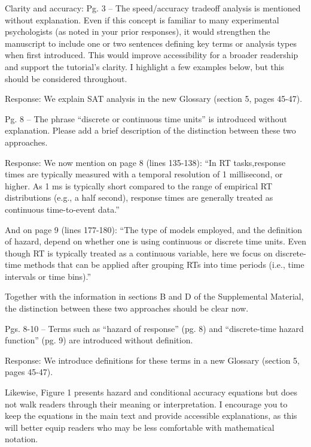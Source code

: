 \documentclass[
]{article}
\renewenvironment{quote}{\begin{leftbar}}{\end{leftbar}}
\begin{document}
\begin{quote}
Clarity and accuracy: Pg. 3 -- The speed/accuracy tradeoff analysis is
mentioned without explanation. Even if this concept is familiar to many
experimental psychologists (as noted in your prior responses), it would
strengthen the manuscript to include one or two sentences defining key
terms or analysis types when first introduced. This would improve
accessibility for a broader readership and support the tutorial's
clarity. I highlight a few examples below, but this should be considered
throughout.
\end{quote}

Response: We explain SAT analysis in the new Glossary (section 5, pages
45-47).

\begin{quote}
Pg. 8 -- The phrase ``discrete or continuous time units'' is introduced
without explanation. Please add a brief description of the distinction
between these two approaches.
\end{quote}

Response: We now mention on page 8 (lines 135-138): ``In RT
tasks,response times are typically measured with a temporal resolution
of 1 millisecond, or higher. As 1 ms is typically short compared to the
range of empirical RT distributions (e.g., a half second), response
times are generally treated as continuous time-to-event data.''

And on page 9 (lines 177-180): ``The type of models employed, and the
definition of hazard, depend on whether one is using continuous or
discrete time units. Even though RT is typically treated as a continuous
variable, here we focus on discrete-time methods that can be applied
after grouping RTs into time periods (i.e., time intervals or time
bins).''

Together with the information in sections B and D of the Supplemental
Material, the distinction between these two approaches should be clear
now.

\begin{quote}
Pgs. 8-10 -- Terms such as ``hazard of response'' (pg. 8) and
``discrete-time hazard function'' (pg. 9) are introduced without
definition.
\end{quote}

Response: We introduce definitions for these terms in a new Glossary
(section 5, pages 45-47).

\begin{quote}
Likewise, Figure 1 presents hazard and conditional accuracy equations
but does not walk readers through their meaning or interpretation. I
encourage you to keep the equations in the main text and provide
accessible explanations, as this will better equip readers who may be
less comfortable with mathematical notation.
\end{quote}
\end{document}
